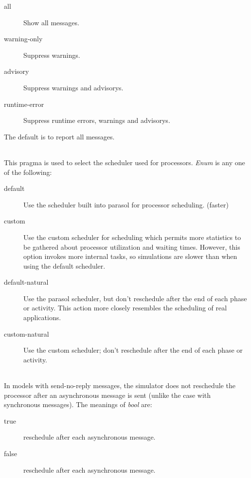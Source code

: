 \begin{description}
\begin{description}
  \item[all] Show all messages.
  \item[warning-only] Suppress warnings.
  \item[advisory] Suppress warnings and advisorys.
  \item[runtime-error] Suppress runtime errors, warnings and advisorys.
  \end{description}
  The default is to report all messages.
\item[\optarg{scheduling-model}{=enum}]~\\
  This pragma is used to select the scheduler used for
  processors.  \emph{Enum} is any one of
  the following:
  \begin{description}
  \item[default] Use the scheduler built into parasol for processor
    scheduling.  (faster)
  \item[custom] Use the custom
    scheduler for scheduling which
    permits more statistics to be gathered about processor
    utilization
    and waiting
    times.  However,
    this option invokes more internal tasks, so simulations are slower
    than when using the default scheduler.
  \item[default-natural] Use the parasol scheduler, but don't
    reschedule after the end of
    each phase or
    activity.
    This action more closely resembles the scheduling of real
    applications.
  \item[custom-natural] Use the custom scheduler; don't reschedule
    after the end of each phase or activity.
  \end{description}
\item[\optarg{reschedule-on-async-send}{\emph{=bool}}]~\\
  In models with send-no-reply messages, the
  simulator does not reschedule the processor after an asynchronous
  message is sent (unlike the case with synchronous messages).  The
  meanings of \emph{bool} are:
  \begin{description}
  \item[true] reschedule after each asynchronous message.
  \item[false] reschedule after each asynchronous message.

\end{description}
\end{description}
